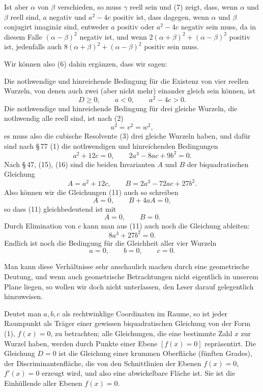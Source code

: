 \documentclass[11pt]{article}
\begin{document}
Ist aber $\alpha$ von $\beta$ verschieden, so muss $\gamma$ reell sein und (7) zeigt, dass, wenn $\alpha$ und $\beta$ reell sind, $a$ negativ und $a^2-4c$ positiv ist, dass dagegen, wenn $\alpha$ und $\beta$ conjugirt imagin\"ar sind, entweder $a$ positiv oder $a^2-4c$ negativ sein muss, da in diesem Falle $(\alpha-\beta)^2$ negativ ist, und wenn $2(\alpha+\beta)^2+(\alpha-\beta)^2$ positiv ist, jedenfalls auch $8(\alpha+\beta)^2+(\alpha-\beta)^2$ positiv sein muss.

Wir k\"onnen also (6) dahin erg\"anzen, dass wir sagen:

Die nothwendige und hinreichende Bedingung f\"ur die Existenz von vier reellen Wurzeln, von denen auch zwei (aber nicht mehr) einander gleich sein k\"onnen, ist
\begin{equation}
        D\geq 0,
        \qquad a<0,
        \qquad a^2-4c>0.
\tag{10}
\end{equation}
Die nothwendige und hinreichende Bedingung f\"ur drei gleiche Wurzeln, die nothwendig alle reell sind, ist nach (2)
\[
        u^2=v^2=w^2,
\]
es muss also die cubische Resolvente (3) drei gleiche Wurzeln haben, und daf\"ur sind nach \S\,77 (1) die nothwendigen und hinreichenden Bedingungen
\begin{equation}
        a^2+12c=0,
        \qquad
        2a^3-8ac+9b^2=0.
\tag{11}
\end{equation}
Nach \S\,47, (15), (16) sind die beiden Invarianten $A$ und $B$ der biquadratischen Gleichung
\[
        A=a^2+12c,
        \qquad
        B=2a^3-72ac+27b^2.
\]
Also k\"onnen wir die Gleichungen (11) auch so schreiben
\[
        A=0,
        \qquad B+4aA=0,
\]
so dass (11) gleichbedeutend ist mit
\[
        A=0,
        \qquad B=0.
\]
Durch Elimination von $c$ kann man aus (11) auch noch die Gleichung ableiten:
\begin{equation}
        8a^3+27b^2=0.
\tag{12}
\end{equation}
Endlich ist noch die Bedingung f\"ur die Gleichheit aller vier Wurzeln
\begin{equation}
        a=0,
        \qquad b=0,
        \qquad c=0.
\tag{13}
\end{equation}

Man kann diese Verh\"altnisse sehr anschaulich machen durch eine geometrische Deutung, und wenn auch geometrische Betrachtungen nicht eigentlich in unserem Plane liegen, so wollen wir doch nicht unterlassen, den Leser darauf gelegentlich hinzuweisen.

Deutet man $a,b,c$ als rechtwinklige Coordinaten im Raume, so ist jeder Raumpunkt als Tr\"ager einer gewissen biquadratischen Gleichung von der Form (1), $f(x)=0$, zu betrachten; alle Gleichungen, die eine bestimmte Zahl $x$ zur Wurzel haben, werden durch Punkte einer Ebene $[f(x)=0]$ repr\"asentirt. Die Gleichung $D=0$ ist die Gleichung einer krummen Oberfl\"ache (f\"unften Grades), der Discriminantenfl\"ache, die von den Schnittlinien der Ebenen $f(x)=0$, $f'(x)=0$ erzeugt wird, und also eine abwickelbare Fl\"ache ist. Sie ist die Einh\"ullende aller Ebenen $f(x)=0$.
\end{document}
